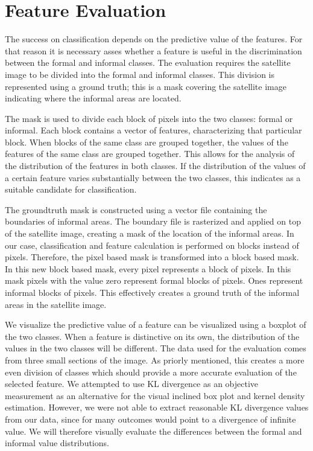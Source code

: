 
\section{Feature Evaluation}

The success on classification depends on the predictive value of the features. For that reason it is necessary asses whether a feature is useful in the discrimination between the formal and informal classes. The evaluation requires the satellite image to be divided into the formal and informal classes. This division is represented using a ground truth; this is a mask covering the satellite image indicating where the informal areas are located.

The mask is used to divide each block of pixels into the two classes: formal or
informal. Each block contains a vector of features, characterizing that particular
block. When blocks of the same class are grouped together, the values of the features
of the same class are grouped together. This allows for the analysis of the distribution of the features in both classes. If the distribution of the values of a certain feature varies substantially between the two classes, this indicates as a suitable candidate for classification.

The groundtruth mask is constructed using a vector file containing the
boundaries of informal areas. The boundary file is rasterized and applied on
top of the satellite image, creating a mask of the location of the informal
areas. In our case, classification and feature calculation is performed on
blocks instead of pixels. Therefore, the pixel based mask is transformed into a block based
mask. In this new block based mask, every pixel represents a block of pixels. In this mask pixels with the value zero represent formal blocks of pixels. Ones represent informal blocks of pixels. This effectively creates a ground truth of the informal areas in the satellite image.  

We visualize the predictive value of a feature can be visualized using a boxplot of the two
classes. When a feature is distinctive on its own, the distribution of the values in the two classes will be different. The data used for the evaluation comes from three small sections of the image. As priorly mentioned, this creates a more even division of classes which should provide a more accurate evaluation of the selected feature. We attempted to use KL divergence as an objective measurement as an alternative for the visual inclined box plot and kernel density estimation. However, we were not able to extract reasonable KL divergence values from our data, since for many outcomes would point to a divergence of infinite value. We will therefore visually evaluate the differences between the formal and informal value distributions.

